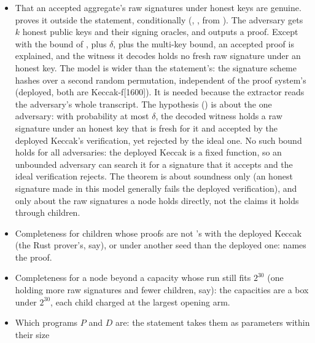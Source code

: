 \documentclass[11pt]{article}
\begin{document}
\begin{itemize}
grinds for it). Not modelled: the outer verifier's sortedness check on the claim lists, its
derivation of the DA digest (the root's grinded membership challenge) and of the statement's
digest, its byte-level parsing, and its run of the verifier with the deployed Keccak (whose
completeness is stated in the RPM only, ).
\item That an accepted aggregate's raw signatures under honest keys are genuine. 
proves it outside the statement, conditionally
(,
, from
). The adversary gets $k$ honest public keys and their signing
oracles, and outputs a proof. Except with the bound of , plus $\delta$, plus the
multi-key bound, an accepted proof is explained, and the witness it decodes holds no fresh raw
signature under an honest key. The model is wider than the statement's: the signature scheme
hashes over a second random permutation, independent of the proof system's (deployed, both are
Keccak-f[1600]). It is needed because the extractor reads the adversary's whole transcript. The
hypothesis () is about the one adversary: with
probability at most $\delta$, the decoded witness holds a raw signature under an honest key that is
fresh for it and accepted by the deployed Keccak's verification, yet rejected by the ideal one.
No such bound holds for all adversaries: the deployed Keccak is a fixed function, so an unbounded
adversary can search it for a signature that it accepts and the ideal verification rejects. The theorem is
about soundness only (an honest signature made in this model generally fails the deployed
verification), and only about the raw signatures a node holds directly, not the claims it holds
through children.
\item Completeness for children whose proofs are not 's with the
deployed Keccak (the Rust prover's, say), or under another seed than the deployed one:
 names the proof.
\item Completeness for a node beyond a capacity whose run still fits $2^{30}$ (one holding more raw signatures and fewer children, say): the capacities are a box under $2^{30}$, each child charged at the largest opening arm.
\item Which programs $P$ and $D$ are: the statement takes them as parameters within their size

\end{itemize}
\end{document}
